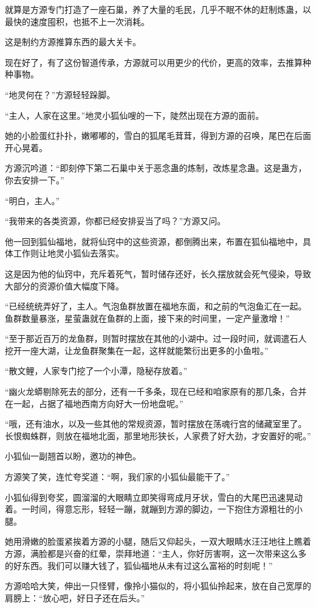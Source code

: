 \begin{this_body}
就算是方源专门打造了一座石巢，养了大量的毛民，几乎不眠不休的赶制炼蛊，以最快的速度囤积，也抵不上一次消耗。

这是制约方源推算东西的最大关卡。

现在好了，有了这份智道传承，方源就可以用更少的代价，更高的效率，去推算种种事物。

“地灵何在？”方源轻轻跺脚。

“主人，人家在这里。”地灵小狐仙嗖的一下，陡然出现在方源的面前。

她的小脸蛋红扑扑，嫩嘟嘟的，雪白的狐尾毛茸茸，得到方源的召唤，尾巴在后面开心晃着。

方源沉吟道：“即刻停下第二石巢中关于恶念蛊的炼制，改炼星念蛊。这是蛊方，你去安排一下。”

“明白，主人。”

“我带来的各类资源，你都已经安排妥当了吗？”方源又问。

他一回到狐仙福地，就将仙窍中的这些资源，都倒腾出来，布置在狐仙福地中，具体工作则让地灵小狐仙去落实。

这是因为他的仙窍中，充斥着死气，暂时储存还好，长久摆放就会死气侵染，导致大部分的资源价值大幅度下降。

“已经统统弄好了，主人。气泡鱼群放置在福地东面，和之前的气泡鱼汇在一起。鱼群数量暴涨，星萤蛊就在鱼群的上面，接下来的时间里，一定产量激增！”

“至于那近百万的龙鱼群，则暂时摆放在其他的小湖中。过一段时间，就调遣石人挖开一座大湖，让龙鱼群聚集在一起，这样就能繁衍出更多的小鱼啦。”

“散文鲤，人家专门挖了一个小潭，隐秘存放着。”

“幽火龙蟒剔除死去的部分，还有一千多条，现在已经和咱家原有的那几条，合并在一起，占据了福地西南方向好大一份地盘呢。”

“哦，还有油水，以及一些其他的常规资源，暂时摆放在荡魂行宫的储藏室里了。长恨蜘蛛群，则放在福地北面，那里地形狭长，人家费了好大劲，才安置好的呢。”

小狐仙一副翘首以盼，邀功的神色。

方源笑了笑，连忙夸奖道：“啊，我们家的小狐仙最能干了。”

小狐仙得到夸奖，圆溜溜的大眼睛立即笑得弯成月牙状，雪白的大尾巴迅速晃动着。一时间，得意忘形，轻轻一蹦，就蹦到方源的脚边，一下抱住方源粗壮的小腿。

她用滑嫩的脸蛋紧挨着方源的小腿，随后又仰起头，一双大眼睛水汪汪地往上瞧着方源，满脸都是兴奋的红晕，崇拜地道：“主人，你好厉害啊，这一次带来这么多的好东西。我们可以赚大钱了，狐仙福地从未有过这么富裕的时刻呢！”

方源哈哈大笑，伸出一只怪臂，像拎小猫似的，将小狐仙拎起来，放在自己宽厚的肩膀上：“放心吧，好日子还在后头。”


\end{this_body}
